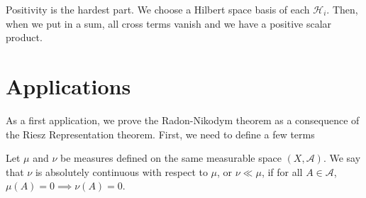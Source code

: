 \documentclass[twoside,symmetric, openany, 12pt]{./tuftebook}
\theoremstyle{definition}
\theoremstyle{definition}
\theoremstyle{definition}
\begin{document}
Positivity is the hardest part. We choose a Hilbert space basis of each $\mathcal{H}_i$. Then, when we put in a sum, all cross terms vanish and we have a positive scalar product.
\section{Applications}
As a first application, we prove the Radon-Nikodym theorem as a consequence of the Riesz Representation theorem. First, we need to define a few terms

\begin{Definition}
	Let $\mu$ and $\nu$ be measures defined on the same measurable space $(X, \mathcal{A})$. We say that $\nu$ is absolutely continuous with respect to $\mu$, or $\nu \ll \mu$, if for all $A\in \mathcal{A}$, $\mu(A)=0\implies \nu(A)=0$.
\end{Definition}
\end{document}
